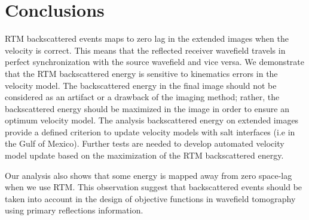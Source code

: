 \section{Conclusions}

RTM backscattered events maps to zero lag in the extended images when the
velocity is correct. This means that the reflected
receiver wavefield travels in perfect synchronization with the source wavefield and
vice versa. We demonstrate that the RTM backscattered energy is sensitive to kinematics errors
in the velocity model. The backscattered energy in the final image should not be considered 
as an artifact or a drawback of the imaging method; rather, the backscattered energy
 should be maximized in the image in order to ensure an optimum velocity 
model. The analysis backscattered energy on extended images provide a defined criterion to update 
velocity models with salt interfaces (i.e in the Gulf of Mexico).
 Further tests are needed to develop automated velocity model update based on the maximization of 
the RTM backscattered energy.

Our analysis also shows that some energy is mapped away from zero space-lag when
we use RTM. This observation suggest that backscattered events should be taken into account in the design 
of objective functions in wavefield tomography using primary reflections information.
